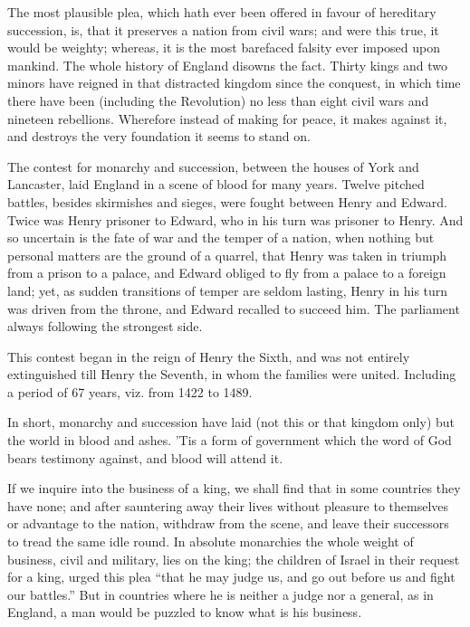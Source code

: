 \documentclass[12pt,oneside]{memoir}
\begin{document}
The most plausible plea, which hath ever been offered in favour of
hereditary succession, is, that it preserves a nation from civil
wars; and were this true, it would be weighty; whereas, it is the
most barefaced falsity ever imposed upon mankind. The whole history
of England disowns the fact. Thirty kings and two minors have
reigned in that distracted kingdom since the conquest, in which time
there have been (including the Revolution) no less than eight civil
wars and nineteen rebellions. Wherefore instead of making for peace,
it makes against it, and destroys the very foundation it seems to
stand on.

The contest for monarchy and succession, between the houses of York
and Lancaster, laid England in a scene of blood for many years.
Twelve pitched battles, besides skirmishes and sieges, were fought
between Henry and Edward. Twice was Henry prisoner to Edward, who in
his turn was prisoner to Henry. And so uncertain is the fate of war
and the temper of a nation, when nothing but personal matters are
the ground of a quarrel, that Henry was taken in triumph from a
prison to a palace, and Edward obliged to fly from a palace to a
foreign land; yet, as sudden transitions of temper are seldom
lasting, Henry in his turn was driven from the throne, and Edward
recalled to succeed him. The parliament always following the
strongest side.

This contest began in the reign of Henry the Sixth, and was not
entirely extinguished till Henry the Seventh, in whom the families
were united. Including a period of 67 years, viz. from 1422 to 1489.

In short, monarchy and succession have laid (not this or that
kingdom only) but the world in blood and ashes. 'Tis a form of
government which the word of God bears testimony against, and blood
will attend it.

If we inquire into the business of a king, we shall find that in
some countries they have none; and after sauntering away their lives
without pleasure to themselves or advantage to the nation, withdraw
from the scene, and leave their successors to tread the same idle
round. In absolute monarchies the whole weight of business, civil
and military, lies on the king; the children of Israel in their
request for a king, urged this plea ``that he may judge us, and go
out before us and fight our battles.'' But in countries where he is
neither a judge nor a general, as in England, a man would be puzzled
to know what is his business.
\end{document}

